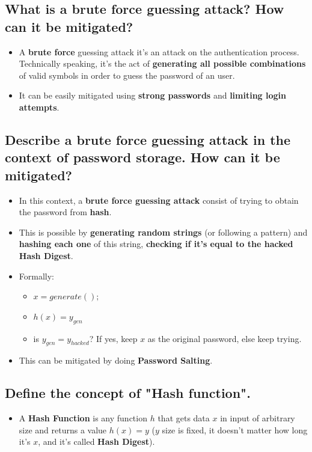 \documentclass[9pt, letterpaper]{article}
\begin{document}
\subsection{What is a brute force guessing attack? How can it be mitigated?}
\begin{itemize}
	\item A \textbf{brute force} guessing attack it's an attack on the authentication process. Technically speaking, it's the act of \textbf{generating all possible combinations} of valid symbols in order to guess the password of an user. 
	\item It can be easily mitigated using \textbf{strong passwords} and \textbf{limiting login attempts}.
\end{itemize}

\subsection{Describe a brute force guessing attack in the context of password storage. How can it be mitigated?}
\begin{itemize}
	\item In this context, a \textbf{brute force guessing attack} consist of trying to obtain the password from \textbf{hash}. 
	\item This is possible by \textbf{generating random strings} (or following a pattern) and \textbf{hashing each one} of this string, \textbf{checking if it's equal to the hacked Hash Digest}.
	\item Formally:
	\begin{itemize}
		\item $x= generate(); $
		\item $h(x)=y_{gen}$
		\item is $y_{gen}= y_{hacked}$? If yes, keep $x$ as the original password, else keep trying.
	\end{itemize}
	\item This can be mitigated by doing \textbf{Password Salting}.
\end{itemize}

\subsection{Define the concept of "Hash function".}
\begin{itemize}
	\item A \textbf{Hash Function} is any function $h$ that gets data $x$ in input of arbitrary size and returns a value $h(x)=y$ ($y$ size is fixed, it doesn't matter how long it's $x$, and it's called \textbf{Hash Digest}).
\end{itemize}
\end{document}
